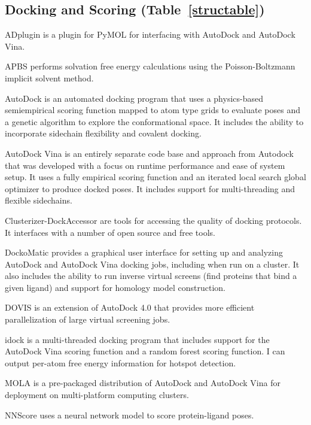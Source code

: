 \subsection*{Docking and Scoring (Table~\ref{structable})}

ADplugin is a plugin for PyMOL for interfacing with AutoDock and AutoDock Vina.

APBS \cite{Baker_2001} performs solvation free energy calculations using the Poisson-Boltzmann implicit solvent method.

AutoDock \cite{Morris_2009} is an automated docking program that uses a physics-based semiempirical scoring function \cite{Huey_2007} mapped to atom type grids to evaluate poses and a genetic algorithm to explore the conformational space.  It includes the ability to incorporate sidechain flexibility and covalent docking.

AutoDock Vina \cite{Trott_2009} is an entirely separate code base and approach from Autodock that was developed with a focus on runtime performance and ease of system setup. It uses a fully empirical scoring function and an iterated local search global optimizer to produce docked poses. It includes support for multi-threading and flexible sidechains.

Clusterizer-DockAccessor \cite{Ballante_2016} are tools for accessing the quality of docking protocols. It interfaces with a number of open source and free tools.

DockoMatic \cite{Bullock_2013}  provides a graphical user interface for setting up and analyzing AutoDock and AutoDock Vina docking jobs, including when run on a cluster. It also includes the ability to run inverse virtual screens (find proteins that bind a given ligand) and support for homology model construction.

DOVIS \cite{Jiang_2008} is an extension of AutoDock 4.0 that provides more efficient parallelization of large virtual screening jobs.

idock \cite{Li_2012} is a multi-threaded docking program that includes support for the AutoDock Vina scoring function and a random forest scoring function. I can output per-atom free energy information for hotspot detection.

MOLA \cite{Abreu_2010} is a pre-packaged distribution of AutoDock and AutoDock Vina for deployment on multi-platform computing clusters.

NNScore \cite{Durrant_2011} uses a neural network model to score protein-ligand poses.

